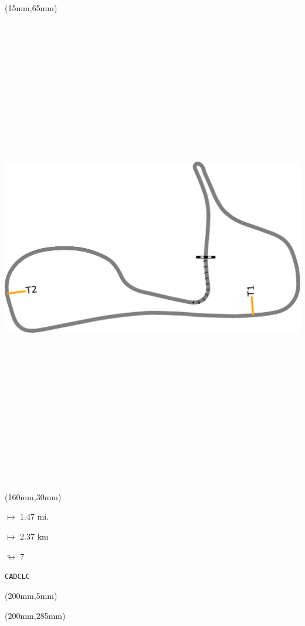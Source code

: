 \begin{textblock*}{185mm}(15mm,65mm)%
\centering
\mbox{\includegraphics[width=185mm,height=210mm,keepaspectratio]{PT/CADCLC.pdf}}
\end{textblock*}
\begin{textblock*}{40mm}(160mm,30mm)%
\Large
\par$\mapsto$ 1.47 mi.
\par$\mapsto$ 2.37 km
\par$\looparrowright$ 7
\par\hfill\tiny\tt CADCLC\\
\end{textblock*}
\begin{textblock*}{20mm}(200mm,5mm)%
\fbox{\thepage}
\label{CADCLC}
\end{textblock*}
\begin{textblock*}{20mm}(200mm,285mm)%
\fbox{\thepage}
\end{textblock*}

